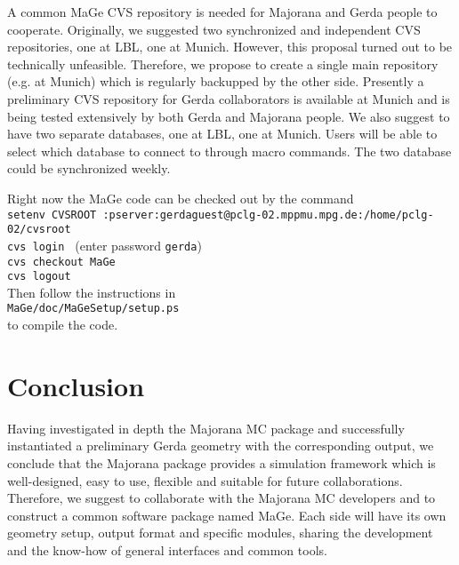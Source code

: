 \documentclass[a4paper,12pt,twoside]{article}
\begin{document}
A common MaGe CVS repository is needed for Majorana and Gerda people to 
cooperate. Originally, we suggested two synchronized and independent 
CVS repositories, one at LBL, one at Munich. 
However, this proposal turned out to be technically unfeasible.
Therefore,
we propose to create a single main repository (e.g. at Munich) which is 
regularly backupped by the other side. 
Presently a preliminary CVS repository for Gerda collaborators is available 
at Munich and is being tested extensively by both Gerda and Majorana
people.
We also suggest to have two separate databases, one at LBL, one at Munich.
Users will be able to select which database to connect to through macro 
commands. The two database could be synchronized weekly.


Right now the MaGe code can be checked out by the command \\
{\tt setenv CVSROOT :pserver:gerdaguest@pclg-02.mppmu.mpg.de:/home/pclg-02/cvsroot \\
cvs login } (enter password {\tt gerda}) \\
{\tt cvs checkout MaGe \\
cvs logout}  \\
Then follow the instructions in \\
{\tt MaGe/doc/MaGeSetup/setup.ps} \\
to compile the code.



\section{Conclusion}
Having investigated in depth the Majorana MC package and successfully 
instantiated a preliminary Gerda geometry with the corresponding output,
we conclude that the Majorana package provides a simulation framework
which is well-designed, easy to use, flexible and suitable for future
collaborations.
Therefore, we suggest to collaborate with the Majorana MC developers 
and to construct a common software package named MaGe.
Each side will have its own geometry setup, output 
format and specific modules, sharing the development and 
the know-how of general interfaces and common tools.

\clearpage
\newpage
\appendix
\end{document}
